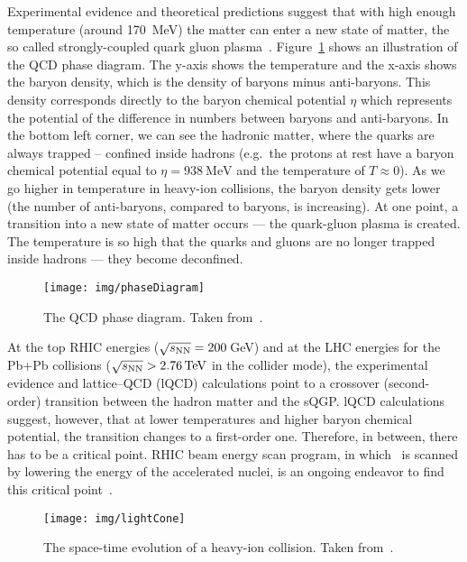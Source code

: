 Experimental evidence and theoretical predictions suggest that with high enough temperature (around \SI{170}{\mega\electronvolt}) the matter can enter a new state of matter, the so called strongly-coupled quark gluon plasma~\cite{QGPdiscovered}\@. Figure~\ref{fig:phaseDiagram} shows an illustration of the QCD phase diagram. The y-axis shows the temperature and the x-axis shows the baryon density, which is the density of baryons minus anti-baryons. This density corresponds directly to the baryon chemical potential $\eta$ which represents the potential of the difference in numbers between baryons and anti-baryons. In the bottom left corner, we can see the hadronic matter, where the quarks are always trapped -- confined inside hadrons (e.g.\ the protons at rest have a baryon chemical potential equal to $\eta = \SI{938}{\mega\electronvolt}$ and the temperature of $T \approx 0$). 
As we go higher in temperature in heavy-ion collisions, the baryon density gets lower (the number of anti-baryons, compared to baryons, is increasing). At one point, a transition into a new state of matter occurs --- the quark-gluon plasma is created. The temperature is so high that the quarks and gluons are no longer trapped inside hadrons --- they become deconfined. 

\begin{figure}[htb]
\centering
\texttt{[image: img/phaseDiagram]}
\caption{The QCD phase diagram. Taken from~\cite{bnlSite}.}
\label{fig:phaseDiagram}
\end{figure}

At the top RHIC energies ($\sqrt{s_\text{NN}} = 200\,$GeV) and at the LHC energies for the Pb+Pb collisions ($\snn > \SI{2.76}{\tera\electronvolt}$ in the collider mode), the experimental evidence and lattice--QCD (lQCD) calculations point to a crossover (second-order) transition between the hadron matter and the sQGP\@. lQCD calculations suggest, however, that at lower temperatures and higher baryon chemical potential, the transition changes to a first-order one. Therefore, in between, there has to be a critical point. RHIC beam energy scan program, in which \snn\ is scanned by lowering the energy of the accelerated nuclei, is an ongoing endeavor to find this critical point~\cite{BESII}. 
 
\begin{figure}[htb]
\centering
\texttt{[image: img/lightCone]}
\caption{The space-time evolution of a heavy-ion collision. Taken from~\cite{helen}.}
\label{fig:lightCone}
\end{figure}

